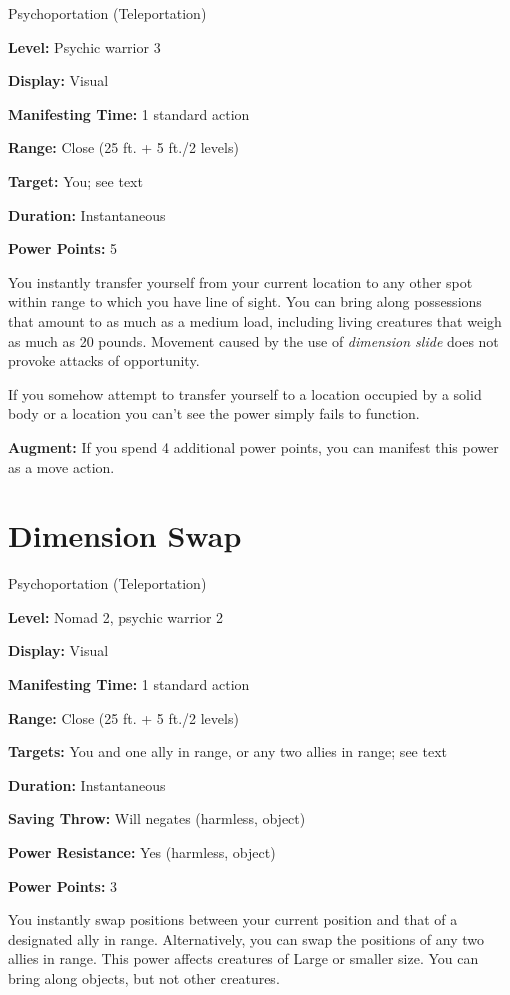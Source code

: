 \documentclass{article}
\begin{document}
Psychoportation (Teleportation)

\textbf{Level:} Psychic warrior 3

\textbf{Display:} Visual

\textbf{Manifesting Time:} 1 standard action

\textbf{Range:} Close (25 ft. + 5 ft./2 levels)

\textbf{Target:} You; see text

\textbf{Duration:} Instantaneous

\textbf{Power Points:} 5

You instantly transfer yourself from your current location to any other spot within 
range to which you have line of sight. You can bring along possessions that amount 
to as much as a medium load, including living creatures that weigh as much as 20 
pounds. Movement caused by the use of \textit{dimension slide }does not provoke 
attacks of opportunity.

If you somehow attempt to transfer yourself to a location occupied by a solid body 
or a location you can't see the power simply fails to function.

\textbf{Augment:} If you spend 4 additional power points, you can manifest this 
power as a move action.

\vspace{12pt}
\section*{Dimension Swap}

Psychoportation (Teleportation)

\textbf{Level:} Nomad 2, psychic warrior 2

\textbf{Display:} Visual

\textbf{Manifesting Time:} 1 standard action

\textbf{Range:} Close (25 ft. + 5 ft./2 levels)

\textbf{Targets:} You and one ally in range, or any two allies in range; see text

\textbf{Duration:} Instantaneous

\textbf{Saving Throw:} Will negates (harmless, object)

\textbf{Power Resistance:} Yes (harmless, object)

\textbf{Power Points:} 3

You instantly swap positions between your current position and that of a designated 
ally in range. Alternatively, you can swap the positions of any two allies in range. 
This power affects creatures of Large or smaller size. You can bring along objects, 
but not other creatures.
\end{document}
